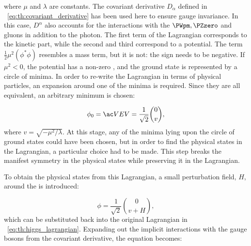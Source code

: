 where $\mu$ and $\lambda$ are constants. The covariant derivative $D_{\alpha}$ defined in \Eq~\ref{eq:th:covariant_derivative} has been used here to ensure gauge invariance. In this case, $D^{\alpha}$ also accounts for the interactions with the $\PWpm, \PZzero$ and gluons in addition to the photon.
The first term of the Lagrangian corresponds to the kinetic part, while the second and third correspond to a potential. %
The term $ \frac{1}{2} \mu^{2} (\phi^{*} \phi)$ resembles a mass term, but it is not: the sign needs to be negative. If $\mu^{2}<0$, the potential has a non-zero \VEV, and the ground state is represented by a circle of minima. In order to re-write the Lagrangian in terms of physical particles, an expansion around one of the minima is required. Since they are all equivalent, an arbitrary minimum is chosen:

\begin{equation}
\label{eq:th:higgs_vev}
\phi_{0} = \VEV = \frac{1}{\sqrt{2}} \binom{0}{v} ,
\end{equation}
where $v=\sqrt{- \mu^{2} / \lambda}$. At this stage, any of the minima lying upon the circle of ground states could have been chosen, but in order to find the physical states in the Lagrangian, a particular choice had to be made. This step breaks the manifest symmetry in the physical states while preserving it in the Lagrangian. 

To obtain the physical states from this Lagrangian, a small perturbation field, $H$, around the \VEV is introduced: 

\begin{equation}
\label{eq:th:higgs_vev_perturbation}
\phi = \frac{1}{\sqrt{2}} \binom{0}{v+H} ,
\end{equation}
which can be substituted back into the original Lagrangian in \Eq~\ref{eq:th:higgs_lagrangian}. Expanding out the implicit interactions with the gauge bosons from the covariant derivative, the equation becomes:

